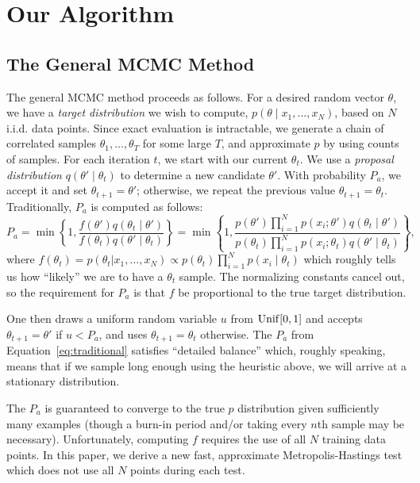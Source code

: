 \documentclass{article}
\begin{document}
\section{Our Algorithm}\label{sec:our_algorithm}

\subsection{The General MCMC Method}\label{sec:general_mcmc}

The general MCMC method proceeds as follows. For a desired random vector $\theta$, we have a
\emph{target distribution} we wish to compute, $p(\theta \mid x_1, \ldots, x_N)$, based on $N$
i.i.d. data points. Since exact evaluation is intractable, we generate a chain of correlated samples
$\theta_1, \ldots, \theta_T$ for some large $T$, and approximate $p$ by using counts of samples. For
each iteration $t$, we start with our current $\theta_t$. We use a \emph{proposal distribution}
$q(\theta' \mid \theta_t)$ to determine a new candidate $\theta'$. With probability $P_a$, we accept
it and set $\theta_{t+1} = \theta'$; otherwise, we repeat the previous value $\theta_{t+1} =
\theta_t$. Traditionally, $P_a$ is computed as follows:
\begin{equation}\label{eq:traditional}
P_a = \min\left\{ 1, \frac{f(\theta')q(\theta_t \mid \theta')}{f(\theta_t)q(\theta' \mid \theta_t)}
\right\} = \min\left\{ 1, \frac{p(\theta')\prod_{i=1}^N p(x_i ; \theta')q(\theta_t \mid \theta')}{p(\theta_t)\prod_{i=1}^N p(x_i ; \theta_t)q(\theta' \mid
\theta_t)} \right\},
\end{equation}
where $f(\theta_t)=p(\theta_t|x_1,\ldots,x_N) \propto p(\theta_t)\prod_{i=1}^N p(x_i
\mid \theta_t)$ which roughly tells us how ``likely'' we are to have a $\theta_t$ sample. The
normalizing constants cancel out, so the requirement for $P_a$ is that $f$ be proportional to the
true target distribution.

One then draws a uniform random variable $u$ from ${\rm Unif}[0,1]$ and accepts $\theta_{t+1} =
\theta'$ if $u < P_a$, and uses $\theta_{t+1} = \theta_t$ otherwise. The $P_a$ from
Equation~\ref{eq:traditional} satisfies ``detailed balance'' which, roughly speaking, means that if
we sample long enough using the heuristic above, we will arrive at a stationary distribution.

The $P_a$ is guaranteed to converge to the true $p$ distribution given sufficiently many examples
(though a burn-in period and/or taking every $n$th sample may be necessary). Unfortunately,
computing $f$ requires the use of all $N$ training data points. In this paper, we derive a new fast,
approximate Metropolis-Hastings test which does not use all $N$ points during each test.
\end{document}
